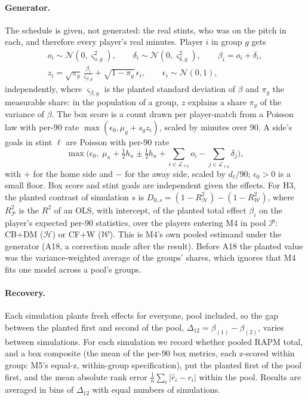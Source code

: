 \documentclass[11pt,a4paper]{article}
\begin{document}
\paragraph{Generator.}
The schedule is given, not generated: the real stints, who was on the pitch in
each, and therefore every player's real minutes. Player $i$ in group $g$ gets
\begin{equation}
\begin{gathered}
  o_i \sim \mathcal N(0, \varsigma^2_{o,g}), \qquad
  \delta_i \sim \mathcal N(0, \varsigma^2_{\delta,g}), \qquad
  \beta_i = o_i + \delta_i, \\
  z_i = \sqrt{\pi_g}\,\frac{\beta_i}{\varsigma_{\beta,g}} + \sqrt{1 - \pi_g}\, \epsilon_i,
  \qquad \epsilon_i \sim \mathcal N(0, 1),
\end{gathered}
  \label{eq:gen-effects}
\end{equation}
independently, where $\varsigma_{\beta,g}$ is the planted standard deviation of
$\beta$ and $\pi_g$ the measurable share: in the population of a group, $z$
explains a share $\pi_g$ of the variance of $\beta$. The box score is a count
drawn per player-match from a Poisson law with per-90 rate
$\max(\epsilon_0, \mu_g + s_g z_i)$, scaled by minutes over 90. A side's goals in
stint $\ell$ are Poisson with per-90 rate
\begin{equation}
  \max\Big(\epsilon_0,\; \mu_{\kappa} + \tfrac12 h_\kappa \pm \tfrac12 h_\kappa
  + \sum_{i \in \mathcal L_{\ell a}} o_i - \sum_{j \in \mathcal L_{\ell\bar a}} \delta_j\Big),
  \label{eq:gen-goals}
\end{equation}
with $+$ for the home side and $-$ for the away side, scaled by $d_\ell / 90$;
$\epsilon_0 > 0$ is a small floor. Box score and stint goals are independent given
the effects. For H3, the planted contrast of simulation $s$ is
$D_{0,s} = (1 - R^2_{\mathcal H}) - (1 - R^2_{\mathcal W})$, where $R^2_{\mathcal P}$
is the $R^2$ of an OLS, with intercept, of the planted total effect $\beta_i$
on the player's expected per-90 statistics, over the players entering M4 in
pool $\mathcal P$: CB+DM ($\mathcal H$) or CF+W ($\mathcal W$). This is M4's own
pooled estimand under the generator (A18, a correction made after the result).
Before A18 the planted value was the variance-weighted average of the groups'
shares, which ignores that M4 fits one model across a pool's groups.

\paragraph{Recovery.}
Each simulation plants fresh effects for everyone, pool included, so the gap
between the planted first and second of the pool,
$\Delta_{12} = \beta_{(1)} - \beta_{(2)}$, varies between simulations. For each
simulation we record whether pooled RAPM total, and a box composite (the mean of
the per-90 box metrics, each z-scored within group: M5's equal-z, within-group
specification), put the planted first of the pool first, and the mean absolute
rank error $\frac1n \sum_i |\hat r_i - r_i|$ within the pool. Results are averaged
in bins of $\Delta_{12}$ with equal numbers of simulations.
\end{document}
